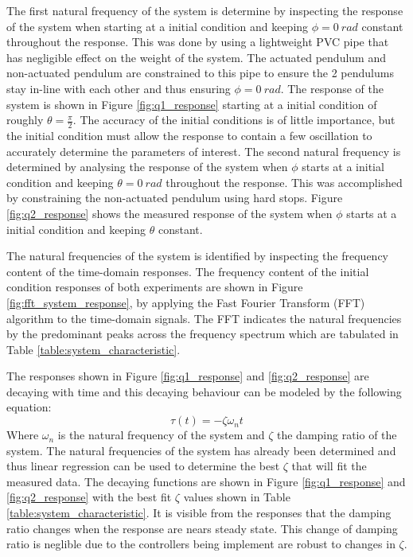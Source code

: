\documentclass[a4paper,12pt]{article}
\begin{document}
	The first natural frequency of the system is determine by inspecting the response of the system when starting at a initial condition and keeping $\phi = \SI{0}{rad}$ constant throughout the response. This was done by using a lightweight PVC pipe that has negligible effect on the weight of the system. The actuated pendulum and non-actuated pendulum are constrained to this pipe to ensure the 2 pendulums stay in-line with each other and thus ensuring $\phi = \SI{0}{rad}$. The response of the system is shown in Figure \ref{fig:q1_response} starting at a initial condition of roughly $\theta = \frac{\pi}{2}$. The accuracy of the initial conditions is of little importance, but the initial condition must allow the response to contain a few oscillation to accurately determine the parameters of interest. The second natural frequency is determined by analysing the response of the system when $\phi$ starts at a initial condition and keeping $\theta = \SI{0}{rad}$ throughout the response. This was accomplished by constraining the non-actuated pendulum using hard stops. Figure \ref{fig:q2_response} shows the measured response of the system when $\phi$ starts at a initial condition and keeping $\theta$ constant.%
	
	The natural frequencies of the system is identified by inspecting the frequency content of the time-domain responses. The frequency content of the initial condition responses of both experiments are shown in Figure \ref{fig:fft_system_response}, by applying the Fast Fourier Transform (FFT) algorithm to the time-domain signals. The FFT indicates the natural frequencies by the predominant peaks across the frequency spectrum which are tabulated in Table \ref{table:system_characteristic}.
	
	The responses shown in Figure \ref{fig:q1_response} and \ref{fig:q2_response} are decaying with time and this decaying behaviour can be modeled by the following equation: $$\tau(t) = -\zeta \omega_{n} t$$ Where $\omega_{n}$ is the natural frequency of the system and $\zeta$ the damping ratio of the system. The natural frequencies of the system has already been determined and thus linear regression can be used to determine the best $\zeta$ that will fit the measured data. The decaying functions are shown in Figure \ref{fig:q1_response} and \ref{fig:q2_response} with the best fit $\zeta$ values shown in Table \ref{table:system_characteristic}. It is visible from the responses that the damping ratio changes when the response are nears steady state. This change of damping ratio is neglible due to the controllers being implement are robust to changes in $\zeta$.
	
\end{document}
